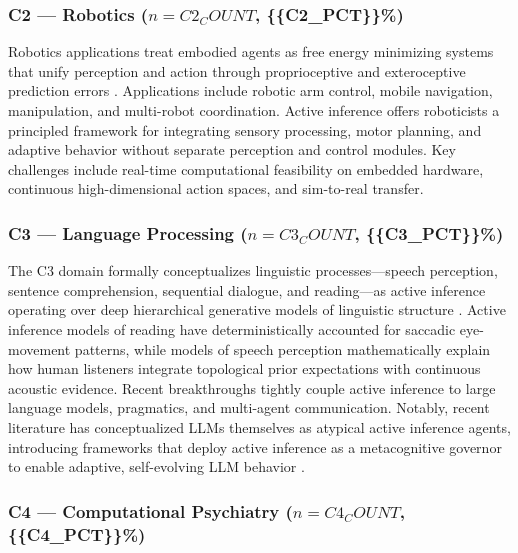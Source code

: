 \documentclass[
]{article}
\begin{document}
\subsubsection{\texorpdfstring{C2 --- Robotics (\(n = {{C2_COUNT}}\),
\{\{C2\_PCT\}\}\%)}{C2 --- Robotics (n = \{\{C2\_COUNT\}\}, \{\{C2\_PCT\}\}\%)}}\label{c2-robotics-n-c2_count-c2_pct}

Robotics applications treat embodied agents as free energy minimizing
systems that unify perception and action through proprioceptive and
exteroceptive prediction errors \citep{lanillos2021active}. Applications
include robotic arm control, mobile navigation, manipulation, and
multi-robot coordination. Active inference offers roboticists a
principled framework for integrating sensory processing, motor planning,
and adaptive behavior without separate perception and control modules.
Key challenges include real-time computational feasibility on embedded
hardware, continuous high-dimensional action spaces, and sim-to-real
transfer.

\subsubsection{\texorpdfstring{C3 --- Language Processing
(\(n = {{C3_COUNT}}\),
\{\{C3\_PCT\}\}\%)}{C3 --- Language Processing (n = \{\{C3\_COUNT\}\}, \{\{C3\_PCT\}\}\%)}}\label{c3-language-processing-n-c3_count-c3_pct}

The C3 domain formally conceptualizes linguistic processes---speech
perception, sentence comprehension, sequential dialogue, and
reading---as active inference operating over deep hierarchical
generative models of linguistic structure \citep{friston2020generative}.
Active inference models of reading have deterministically accounted for
saccadic eye-movement patterns, while models of speech perception
mathematically explain how human listeners integrate topological prior
expectations with continuous acoustic evidence. Recent breakthroughs
tightly couple active inference to large language models, pragmatics,
and multi-agent communication. Notably, recent literature has
conceptualized LLMs themselves as atypical active inference agents,
introducing frameworks that deploy active inference as a metacognitive
governor to enable adaptive, self-evolving LLM behavior
\citep{heins2024active}.

\subsubsection{\texorpdfstring{C4 --- Computational Psychiatry
(\(n = {{C4_COUNT}}\),
\{\{C4\_PCT\}\}\%)}{C4 --- Computational Psychiatry (n = \{\{C4\_COUNT\}\}, \{\{C4\_PCT\}\}\%)}}\label{c4-computational-psychiatry-n-c4_count-c4_pct}
\end{document}
